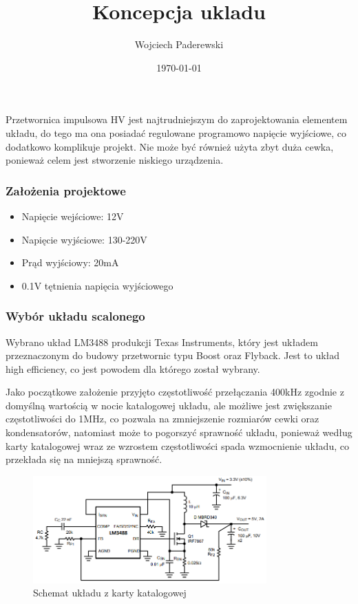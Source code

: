 \documentclass[../../main.tex]{subfiles}
\author{Wojciech Paderewski}
\date{\today}
\title{Koncepcja ukladu}
\begin{document}
Przetwornica impulsowa HV jest najtrudniejszym do zaprojektowania elementem układu, 
do tego ma ona posiadać regulowane programowo napięcie wyjściowe, co dodatkowo komplikuje projekt.
Nie może być również użyta zbyt duża cewka, ponieważ celem jest stworzenie niskiego urządzenia.

\subsubsection{Założenia projektowe}
\begin{itemize}
    \item Napięcie wejściowe: 12\si{\volt}
    \item Napięcie wyjściowe: 130-220\si{\volt}
    \item Prąd wyjściowy: 20\si{\milli\ampere}
    \item 0.1\si{\volt} tętnienia napięcia wyjściowego
\end{itemize}

\subsubsection{Wybór układu scalonego}
Wybrano układ LM3488 produkcji Texas Instruments, który jest układem przeznaczonym do budowy przetwornic typu Boost oraz Flyback. 
Jest to układ high efficiency, co jest powodem dla którego został wybrany\cite{st:lm3488}.

Jako początkowe założenie przyjęto częstotliwość przełączania 400kHz zgodnie z domyślną wartością w nocie katalogowej układu, 
ale możliwe jest zwiększanie częstotliwości do 1MHz, co pozwala na zmniejszenie rozmiarów cewki oraz kondensatorów, natomiast może to
pogorszyć sprawność układu, ponieważ według karty katalogowej wraz ze wzrostem częstotliwości spada wzmocnienie układu, co przekłada się na mniejszą sprawność.

\begin{figure}[H]
    \centering
    \includegraphics[width=0.8\textwidth]{boost.png}
    \caption{Schemat układu z karty katalogowej\cite{st:lm3488}}
\end{figure}
\end{document}
